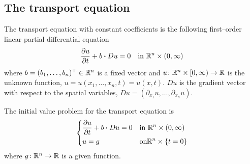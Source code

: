 
\subsection{The transport equation}

The transport equation with constant coefficients is the following first--order
linear partial differential equation
\begin{equation}
    \frac{\partial u}{\partial t} + b \vdot D u = 0 \quad \text{in } \real^n \times (0,\infty)
\end{equation}
where $b = (b_1, \ldots, b_n)^\top \in \mathbb{R}^n$ is a fixed vector and $u \colon
\mathbb{R}^n \times [0,\infty) \rightarrow \mathbb{R}$ is the unknown function, $u =
u(x_1, \ldots, x_n, t) = u(x,t)$. $D u$ is the gradient vector with respect to
the spatial variables, $D u = (\partial_{x_1} u, \ldots, \partial_{x_n} u)$.

The initial value problem for the transport equation is
\begin{equation}
    \left\{
        \begin{aligned}
            &\dfrac{\partial u}{\partial t} + b \vdot D u = 0 & &\text{in } \real^n \times (0,\infty) \\
            &u = g & &\text{on} \real^n \times \{ t = 0 \}
        \end{aligned}
    \right.
\end{equation}
where $g \colon \mathbb{R}^n \to \mathbb{R}$ is a given function. 




